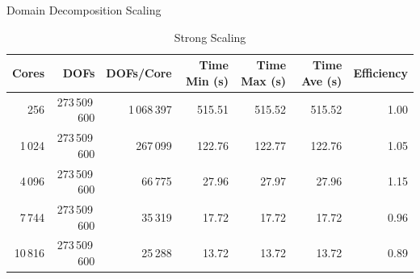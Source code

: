 \documentclass{beamer}
\begin{document}
\begin{frame}{Domain Decomposition Scaling}

  \vspace{-0.2in}

  \begin{table}[htb!]
    \tiny
    \begin{center}
      \begin{tabular}{rrrrrrr}
        \toprule
        \multicolumn{1}{r}{Cores} &
        \multicolumn{1}{r}{DOFs} &
        \multicolumn{1}{r}{DOFs/Core} &
        \multicolumn{1}{r}{Time Min (s)} &
        \multicolumn{1}{r}{Time Max (s)} &
        \multicolumn{1}{r}{Time Ave (s)} &
        \multicolumn{1}{r}{Efficiency}
        \\ \midrule
        256 & 273\,509\,600 & 1\,068\,397 & 515.51 & 515.52 & 515.52 & 1.00 \\
        1\,024 & 273\,509\,600 & 267\,099 & 122.76 & 122.77 & 122.76 & 1.05 \\ %
        4\,096 & 273\,509\,600 & 66\,775 & 27.96 & 27.97 & 27.96 & 1.15 \\
        7\,744 & 273\,509\,600 & 35\,319 & 17.72 & 17.72 & 17.72 & 0.96 \\
        10\,816 & 273\,509\,600 & 25\,288 & 13.72 & 13.72 & 13.72 & 0.89 \\
        \bottomrule
      \end{tabular}
    \end{center}
    \vspace{-0.07in}
    \caption{\small Strong Scaling}
  \end{table}

  \vspace{-0.4in}


\end{frame}
\end{document}
